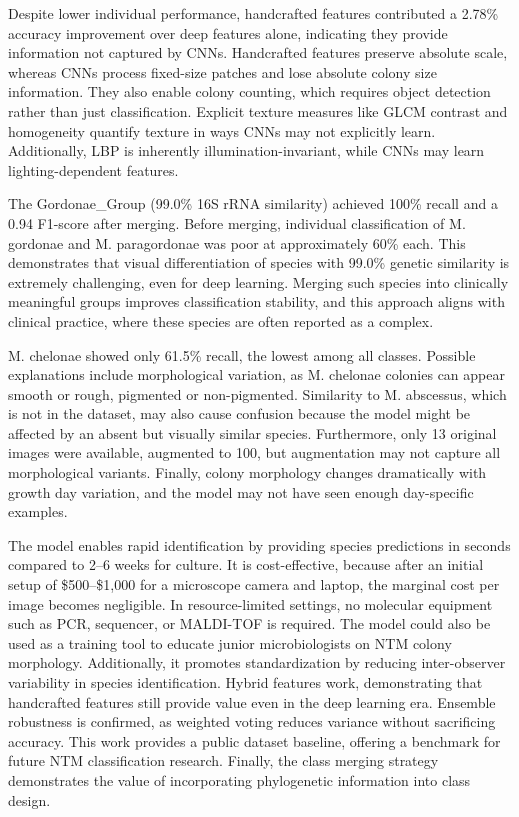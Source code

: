 \documentclass[journal,article,submit,pdftex,moreauthors]{Definitions/mdpi}
\begin{document}
Despite lower individual performance, handcrafted features contributed a 2.78\% 
accuracy improvement over deep features alone, indicating they provide information not 
captured by CNNs. Handcrafted features preserve absolute scale, whereas CNNs 
process fixed-size patches and lose absolute colony size information. They also enable 
colony counting, which requires object detection rather than just classification. Explicit 
texture measures like GLCM contrast and homogeneity quantify texture in ways CNNs 
may not explicitly learn. Additionally, LBP is inherently illumination-invariant, while CNNs 
may learn lighting-dependent features. 

The Gordonae\_Group (99.0\% 16S rRNA similarity) achieved 100\% recall and a 0.94 
F1-score after merging. Before merging, individual classification of M. gordonae and M. 
paragordonae was poor at approximately 60\% each. This demonstrates that visual 
differentiation of species with 99.0\% genetic similarity is extremely challenging, even for 
deep learning. Merging such species into clinically meaningful groups improves 
classification stability, and this approach aligns with clinical practice, where these 
species are often reported as a complex. 

M. chelonae showed only 61.5\% recall, the lowest among all classes. Possible 
explanations include morphological variation, as M. chelonae colonies can appear 
smooth or rough, pigmented or non-pigmented. Similarity to M. abscessus, which is not 
in the dataset, may also cause confusion because the model might be affected by an 
absent but visually similar species. Furthermore, only 13 original images were available, 
augmented to 100, but augmentation may not capture all morphological variants. 
Finally, colony morphology changes dramatically with growth day variation, and the 
model may not have seen enough day-specific examples.

The model enables rapid identification by providing species predictions in seconds 
compared to 2–6 weeks for culture. It is cost-effective, because after an initial setup of 
\$500–\$1,000 for a microscope camera and laptop, the marginal cost per image 
becomes negligible. In resource-limited settings, no molecular equipment such as PCR, 
sequencer, or MALDI-TOF is required. The model could also be used as a training tool to 
educate junior microbiologists on NTM colony morphology. Additionally, it promotes 
standardization by reducing inter-observer variability in species identification.  
Hybrid features work, demonstrating that handcrafted features still provide value even in 
the deep learning era. Ensemble robustness is confirmed, as weighted voting reduces 
variance without sacrificing accuracy. This work provides a public dataset baseline, 
offering a benchmark for future NTM classification research. Finally, the class merging 
strategy demonstrates the value of incorporating phylogenetic information into class 
design.  
\end{document}
